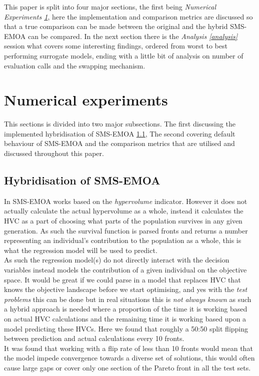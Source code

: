 \documentclass[sigconf,review,nonacm]{acmart}
\begin{document}
\noindent This paper is split into four major sections, the first being \textit{Numerical Experiments \ref{numerical}}, here the implementation and comparison metrics are discussed so that a true comparison can be made between the original and the hybrid SMS-EMOA can be compared. In the next section there is the \textit{Analysis \ref{analysis}} session what covers some interesting findings, ordered from worst to best performing surrogate models, ending with a little bit of analysis on number of evaluation calls and the swapping mechanism.

\balance

\section{Numerical experiments}
\label{numerical}

This sections is divided into two major subsections. The first discussing the implemented hybridisation of SMS-EMOA \ref{hybrid}, The second covering default behaviour of SMS-EMOA and the comparison metrics that are utilised and discussed throughout this paper. 

\subsection{Hybridisation of SMS-EMOA}
\label{hybrid}

In SMS-EMOA works based on the \textit{hypervolume} indicator. However it does not actually calculate the actual hypervolume as a whole, instead it calculates the HVC as a part of choosing what parts of the population survives in any given generation. As such the survival function is parsed fronts and returns a number representing an individual's contribution to the population as a whole, this is what the regression model will be used to predict. \\

\noindent As such the regression model(s) do not directly interact with the decision variables instead models the contribution of a given individual on the objective space. 
It would be great if we could parse in a model that replaces HVC that knows the objective landscape before we start optimising, and yes with the \textit{test problems} this can be done but in real situations this is \textit{not always known} as such a hybrid approach is needed where a proportion of the time it is working based on actual HVC calculations and the remaining time it is working based upon a model predicting these HVCs. Here we found that roughly a 50:50 split flipping between prediction and actual calculations every 10 fronts. \\
It was found that working with a flip rate of less than 10 fronts would mean that the model impede convergence towards a diverse set of solutions, this would often cause large gaps or cover only one section of the Pareto front in all the test sets. 
\end{document}
